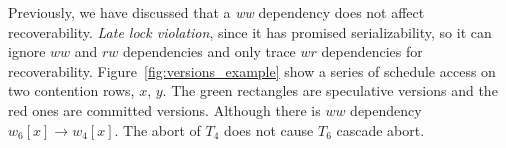 \documentclass[conference]{IEEEtran}
\begin{document}
Previously, we have discussed that a \emph{ww} dependency does not affect recoverability.
\emph{Late lock violation}, since it has promised serializability, so it can ignore ${ww}$ and ${rw}$ dependencies and only trace ${wr}$ dependencies for recoverability.
Figure~\ref{fig:versions_example} show a series of schedule access on two contention rows, ${x}$, ${y}$.
The green rectangles are speculative versions and the red ones are committed versions.
Although there is ${ww}$ dependency ${w_6[x] \rightarrow w_4[x]}$.
The abort of $T_4$ does not cause ${T_6}$ cascade abort.
\begin{figure}[htbp]
  \centering
\end{figure}
\end{document}
